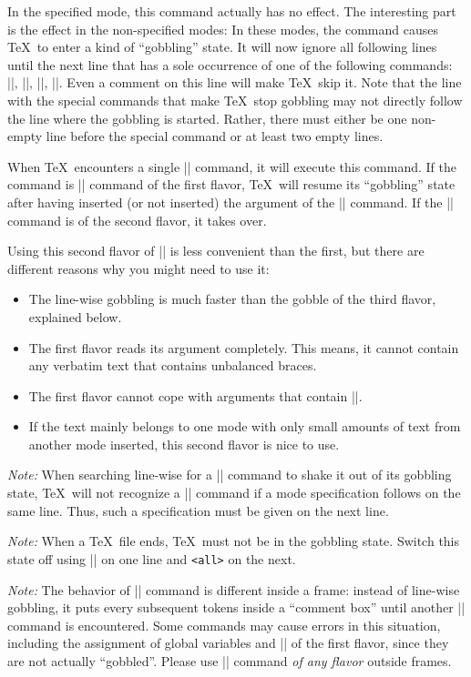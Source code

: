 \begin{command}{\mode{}}
  In the specified mode, this command actually has no effect. The interesting part is the effect in the non-specified modes: In these modes, the command causes \TeX\ to enter a kind of ``gobbling'' state. It will now ignore all following lines until the next line that has a sole occurrence of one of the following commands: |\mode|, |\mode*|, ||, ||. Even a comment on this line will make \TeX\ skip it. Note that the line with the special commands that make \TeX\ stop gobbling may not directly follow the line where the gobbling is started. Rather, there must either be one non-empty line before the special command or at least two empty lines.

  When \TeX\ encounters a single |\mode| command, it will execute this command. If the command is |\mode| command of the first flavor, \TeX\ will resume its ``gobbling'' state after having inserted (or not inserted) the argument of the |\mode| command. If the |\mode| command is of the second flavor, it takes over.

  Using this second flavor of |\mode| is less convenient than the first, but there are different reasons why you might need to use it:
  \begin{itemize}
  \item
    The line-wise gobbling is much faster than the gobble of the third flavor, explained below.
  \item
    The first flavor reads its argument completely. This means, it cannot contain any verbatim text that contains unbalanced braces.
  \item
    The first flavor cannot cope with arguments that contain ||.
  \item
    If the text mainly belongs to one mode with only small amounts of text from another mode inserted, this second flavor is nice to use.
  \end{itemize}

  \emph{Note:} When searching line-wise for a |\mode| command to shake it out of its gobbling state, \TeX\ will not recognize a |\mode| command if a mode specification follows on the same line. Thus, such a specification must be given on the next line.

  \emph{Note:} When a \TeX\ file ends, \TeX\ must not be in the gobbling state. Switch this state off using |\mode| on one line and \Verb|<all>| on the next.

  \emph{Note:} The behavior of |\mode| command is different inside a frame: instead of line-wise gobbling, it puts every subsequent tokens inside a ``comment box'' until another |\mode| command is encountered. Some commands may cause errors in this situation, including the assignment of global variables and |\mode| of the first flavor, since they are not actually ``gobbled''. Please use |\mode| command \emph{of any flavor} outside frames.


\end{command}
